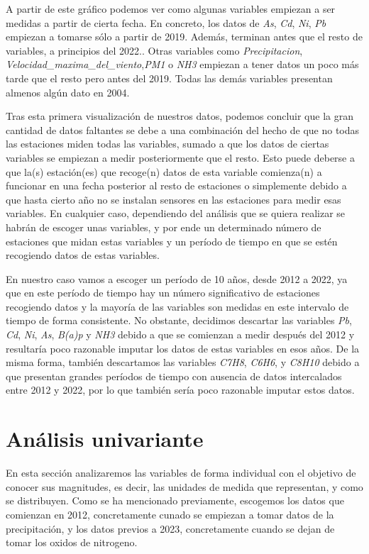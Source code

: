 \documentclass[notspecified,article,submit,moreauthors,pdftex]{Definitions/mdpi}
\begin{document}
A partir de este gráfico podemos ver como algunas variables empiezan a
ser medidas a partir de cierta fecha. En concreto, los datos de
\emph{As}, \emph{Cd}, \emph{Ni}, \emph{Pb} empiezan a tomarse sólo a
partir de 2019. Además, terminan antes que el resto de variables, a
principios del 2022.. Otras variables como \emph{Precipitacion},
\emph{Velocidad\_maxima\_del\_viento},\emph{PM1} o \emph{NH3} empiezan a
tener datos un poco más tarde que el resto pero antes del 2019. Todas
las demás variables presentan almenos algún dato en 2004.

Tras esta primera visualización de nuestros datos, podemos concluir que
la gran cantidad de datos faltantes se debe a una combinación del hecho
de que no todas las estaciones miden todas las variables, sumado a que
los datos de ciertas variables se empiezan a medir posteriormente que el
resto. Esto puede deberse a que la(s) estación(es) que recoge(n) datos
de esta variable comienza(n) a funcionar en una fecha posterior al resto
de estaciones o simplemente debido a que hasta cierto año no se instalan
sensores en las estaciones para medir esas variables. En cualquier caso,
dependiendo del análisis que se quiera realizar se habrán de escoger
unas variables, y por ende un determinado número de estaciones que midan
estas variables y un período de tiempo en que se estén recogiendo datos
de estas variables.

En nuestro caso vamos a escoger un período de 10 años, desde 2012 a
2022, ya que en este período de tiempo hay un número significativo de
estaciones recogiendo datos y la mayoría de las variables son medidas en
este intervalo de tiempo de forma consistente. No obstante, decidimos
descartar las variables \emph{Pb}, \emph{Cd}, \emph{Ni}, \emph{As},
\emph{B(a)p} y \emph{NH3} debido a que se comienzan a medir después del
2012 y resultaría poco razonable imputar los datos de estas variables en
esos años. De la misma forma, también descartamos las variables
\emph{C7H8}, \emph{C6H6}, y \emph{C8H10} debido a que presentan grandes
períodos de tiempo con ausencia de datos intercalados entre 2012 y 2022,
por lo que también sería poco razonable imputar estos datos.

\hypertarget{anuxe1lisis-univariante}{%
\section{Análisis univariante}\label{anuxe1lisis-univariante}}

En esta sección analizaremos las variables de forma individual con el
objetivo de conocer sus magnitudes, es decir, las unidades de medida que
representan, y como se distribuyen. Como se ha mencionado previamente,
escogemos los datos que comienzan en 2012, concretamente cunado se
empiezan a tomar datos de la precipitación, y los datos previos a 2023,
concretamente cuando se dejan de tomar los oxidos de nitrogeno.
\end{document}
